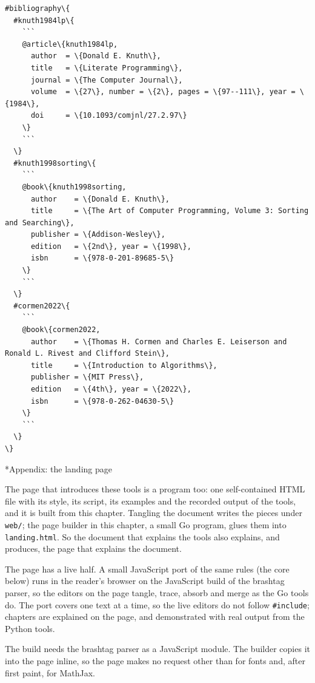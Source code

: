 \documentclass[10pt,a4paper]{article}
\makeatletter
\renewcommand\section{\@startsection{section}{1}{\z@}{-3.2ex \@plus -1ex \@minus -.2ex}{1.2ex \@plus .2ex}{\normalfont\LARGE\itshape}}
\makeatother
\begin{document}
\begin{Verbatim}
#bibliography\{
  #knuth1984lp\{
    ```
    @article\{knuth1984lp,
      author  = \{Donald E. Knuth\},
      title   = \{Literate Programming\},
      journal = \{The Computer Journal\},
      volume  = \{27\}, number = \{2\}, pages = \{97--111\}, year = \{1984\},
      doi     = \{10.1093/comjnl/27.2.97\}
    \}
    ```
  \}
  #knuth1998sorting\{
    ```
    @book\{knuth1998sorting,
      author    = \{Donald E. Knuth\},
      title     = \{The Art of Computer Programming, Volume 3: Sorting and Searching\},
      publisher = \{Addison-Wesley\},
      edition   = \{2nd\}, year = \{1998\},
      isbn      = \{978-0-201-89685-5\}
    \}
    ```
  \}
  #cormen2022\{
    ```
    @book\{cormen2022,
      author    = \{Thomas H. Cormen and Charles E. Leiserson and Ronald L. Rivest and Clifford Stein\},
      title     = \{Introduction to Algorithms\},
      publisher = \{MIT Press\},
      edition   = \{4th\}, year = \{2022\},
      isbn      = \{978-0-262-04630-5\}
    \}
    ```
  \}
\}
\end{Verbatim}

\hypertarget{h-Appendix-the-landing-page}{}
\section*{Appendix: the landing page}

The page that introduces these tools is a program too: one self-contained HTML file with its style, its script, its examples and the recorded output of the tools, and it is built from this chapter. Tangling the document writes the pieces under \texttt{web/\allowbreak{}}; the page builder in this chapter, a small Go program, glues them into \texttt{landing.\allowbreak{}html}. So the document that explains the tools also explains, and produces, the page that explains the document.

The page has a live half. A small JavaScript port of the same rules (the core below) runs in the reader's browser on the JavaScript build of the brashtag parser, so the editors on the page tangle, trace, absorb and merge as the Go tools do. The port covers one text at a time, so the live editors do not follow \texttt{\#include}; chapters are explained on the page, and demonstrated with real output from the Python tools.

The build needs the brashtag parser as a JavaScript module. The builder copies it into the page inline, so the page makes no request other than for fonts and, after first paint, for MathJax.
\end{document}
